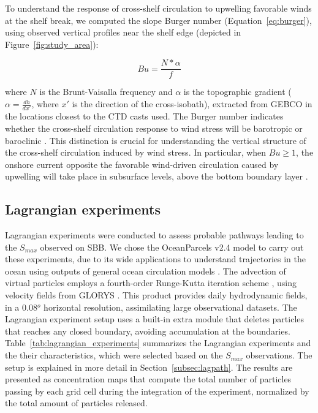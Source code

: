 \documentclass[draft]{agujournal2019}
\begin{document}
To understand the response of cross-shelf circulation to upwelling favorable winds at the shelf break, we computed the slope Burger number (Equation~\ref{eq:burger}), using observed vertical profiles near the shelf edge (depicted in Figure~\ref{fig:study_area}):

\begin{linenomath*}
\begin{equation}
\label{eq:burger}
Bu = \frac{N*\alpha}{f}
\end{equation}
\end{linenomath*}

where $N$ is the Brunt-Vaisalla frequency and $\alpha$ is the topographic gradient ($\alpha = \frac{dh}{dx'}$, where $x'$ is the direction of the cross-isobath), extracted from GEBCO in the locations closest to the CTD casts used. The Burger number indicates whether the cross-shelf circulation response to wind stress will be barotropic or baroclinic \cite{clarke1985,LentzChapman2004}. This distinction is crucial for understanding the vertical structure of the cross-shelf circulation induced by wind stress. In particular, when $Bu \geq 1$, the onshore current opposite the favorable wind-driven circulation caused by upwelling will take place in subsurface levels, above the bottom boundary layer \cite{LentzChapman2004}.

\subsection{Lagrangian experiments} 

Lagrangian experiments were conducted to assess probable pathways leading to the \textit{$S_{max}$} observed on SBB. We chose the OceanParcels v2.4 model \cite{delandmeter2019parcels} to carry out these experiments, due to its wide applications to understand trajectories in the ocean using outputs of general ocean circulation models \cite{valles2022water,dawson2023pathways,seijo2023intrusions}. The advection of virtual particles employs a fourth-order Runge-Kutta iteration scheme \cite{delandmeter2019parcels}, using velocity fields from GLORYS \cite{jean2021glorys}. This product provides daily hydrodynamic fields, in a 0.08$^o$ horizontal resolution, assimilating large observational datasets. The Lagrangian experiment setup uses a built-in extra module that deletes particles that reaches any closed boundary, avoiding accumulation at the boundaries. Table~\ref{tab:lagrangian_experiments} summarizes the Lagrangian experiments and the their characteristics, which were selected based on the \textit{$S_{max}$} observations. The setup is explained in more detail in Section~\ref{subsec:lagpath}. The results are presented as concentration maps that compute the total number of particles passing by each grid cell during the integration of the experiment, normalized by the total amount of particles released.
\end{document}
